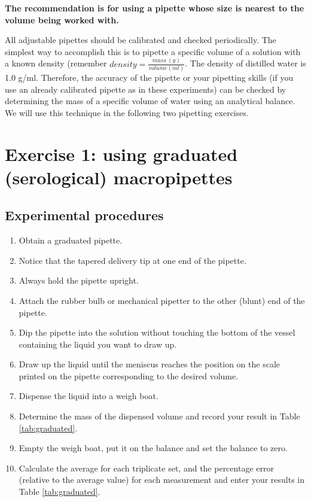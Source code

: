 \documentclass[]{book}
\providecommand{\tightlist}{%
  \setlength{\itemsep}{0pt}\setlength{\parskip}{0pt}}
\theoremstyle{definition}
\theoremstyle{definition}
\theoremstyle{definition}
\theoremstyle{remark}
\let\BeginKnitrBlock\begin \let\EndKnitrBlock\end
\begin{document}
\BeginKnitrBlock{rmdnote}
\textbf{The recommendation is for using a pipette whose size is nearest
to the volume being worked with.}
\EndKnitrBlock{rmdnote}

All adjustable pipettes should be calibrated and checked periodically.
The simplest way to accomplish this is to pipette a specific volume of a
solution with a known density (remember
\(density = \frac{mass\ (g)}{volume (ml)}\). The density of distilled
water is 1.0 g/ml. Therefore, the accuracy of the pipette or your
pipetting skills (if you use an already calibrated pipette as in these
experiments) can be checked by determining the mass of a specific volume
of water using an analytical balance. We will use this technique in the
following two pipetting exercises.

\section{Exercise 1: using graduated (serological)
macropipettes}\label{exercise-1-using-graduated-serological-macropipettes}

\subsection{Experimental procedures}\label{experimental-procedures-5}

\begin{enumerate}
\def\labelenumi{\arabic{enumi}.}
\tightlist
\item
  Obtain a graduated pipette.
\item
  Notice that the tapered delivery tip at one end of the pipette.
\item
  Always hold the pipette upright.
\item
  Attach the rubber bulb or mechanical pipetter to the other (blunt) end
  of the pipette.
\item
  Dip the pipette into the solution without touching the bottom of the
  vessel containing the liquid you want to draw up.
\item
  Draw up the liquid until the meniscus reaches the position on the
  scale printed on the pipette corresponding to the desired volume.
\item
  Dispense the liquid into a weigh boat.
\item
  Determine the mass of the dispensed volume and record your result in
  Table \ref{tab:graduated}.
\item
  Empty the weigh boat, put it on the balance and set the balance to
  zero.
\item
  Calculate the average for each triplicate set, and the percentage
  error (relative to the average value) for each measurement and enter
  your results in Table \ref{tab:graduated}.
\end{enumerate}
\end{document}
